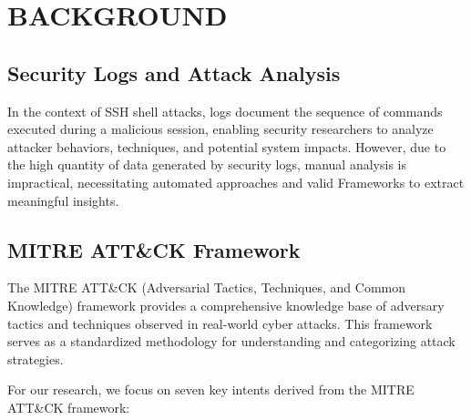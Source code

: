 

\section{BACKGROUND}


    \subsection{Security Logs and Attack Analysis}
    

        In the context of SSH shell attacks, logs document the sequence of commands executed during a malicious session, enabling security researchers to analyze attacker behaviors, techniques, and potential system impacts. However, due to the high quantity of data generated by security logs, manual analysis is impractical, necessitating automated approaches and valid Frameworks to extract meaningful insights.

    \subsection{MITRE ATT\&CK Framework}
    
        The MITRE ATT\&CK (Adversarial Tactics, Techniques, and Common Knowledge) framework provides a comprehensive knowledge base of adversary tactics and techniques observed in real-world cyber attacks. This framework serves as a standardized methodology for understanding and categorizing attack strategies.

        \noindent For our research, we focus on seven key intents derived from the MITRE ATT\&CK framework:

